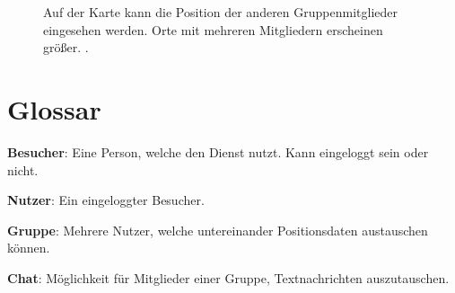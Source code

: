 \documentclass[parskip=full,11pt]{scrartcl}
\begin{document}
\begin{figure}[hb]
		\caption{\label{fig:map}
			Auf der Karte kann die Position der anderen Gruppenmitglieder eingesehen werden.
			Orte mit mehreren Mitgliedern erscheinen größer.
			.
		}
\end{figure}

\section{Glossar}

\textbf{Besucher}:
Eine Person, welche den Dienst nutzt.
Kann eingeloggt sein oder nicht.

\textbf{Nutzer}:
Ein eingeloggter Besucher.

\textbf{Gruppe}:
Mehrere Nutzer, welche untereinander Positionsdaten austauschen können.

\textbf{Chat}:
Möglichkeit für Mitglieder einer Gruppe, Textnachrichten auszutauschen.
\end{document}
